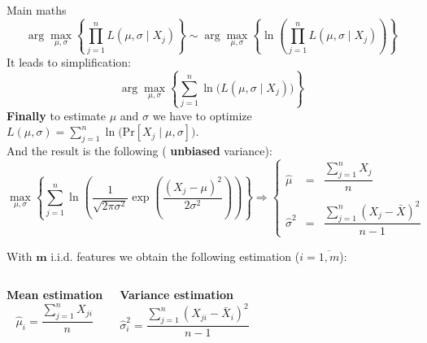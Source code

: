 \documentclass[11pt, aspectratio=169]{beamer}
\newcommand{\emphtext}[1]{\color{black} \textbf{#1}}
\newcommand{\Prob}[1]{\text{Pr}\left[#1\right]}
\begin{document}
\begin{frame}[allowframebreaks]{Main maths}
    	\begin{equation}
    		\arg \max_{\mu, \sigma} \left\{ \prod_{j = 1}^{n} L\left(\mu, \sigma \mid X_j\right) \right\} \sim \arg \max_{\mu, \sigma} \left\{ \ln\left(\prod_{j = 1}^{n} L\left(\mu, \sigma \mid X_j\right)\right) \right\}
    	\end{equation}
    	\noindent It leads to simplification:
    	\begin{equation}
    		\arg \max_{\mu, \sigma} \left\{ \sum_{j = 1}^{n} \ln \Big( L\left(\mu, \sigma \mid X_j\right) \Big) \right\}
    	\end{equation}
    	\noindent \emphtext{Finally} to estimate $\mu$ and $\sigma$ we have to optimize $L\left(\mu, \sigma\right) = \sum_{j = 1}^{n} \ln \Big(\Prob{X_j \mid \mu, \sigma}\Big)$.\\[5pt]
    	\noindent And the result is the following (\emphtext{unbiased} variance):
    	\begin{equation}
    		\label{eqn:mle_normal}
    			 \max_{\mu, \sigma} \left\{\sum_{j = 1}^{n} \ln \left( \dfrac{1}{\sqrt{2\pi\sigma^2}} \exp\left(\dfrac{\left(X_j - \mu \right)^2}{2\sigma^2}\right) \right)\right\} \Rightarrow
    			 \left\{\begin{array}{lcl}
    			 	\displaystyle \hat{\mu} &\displaystyle =&\displaystyle \dfrac{\sum_{j = 1}^n X_j}{n}\\\\
    			 	\displaystyle \hat{\sigma}^2 &\displaystyle =&\displaystyle \dfrac{\sum_{j = 1}^n \left(X_j - \bar{X}\right)^2}{n - 1}
    			 \end{array}\right.
    	\end{equation}
    	\framebreak
    	
    	\noindent With $\bm{m}$ i.i.d. features we obtain the following estimation ($i = \overline{1, m}$):
    	\begin{columns}[t]
    		\begin{block}{\textbf{Mean estimation}}
    			\begin{equation}
    				\label{eqn:mle_normal_m_features_1}
    				\hat{\mu}_i = \frac{\sum_{j = 1}^n X_{ji}}{n}
    			\end{equation}
    		\end{block}
    		\begin{block}{\textbf{Variance estimation}}
    			\begin{equation}
    				\label{eqn:mle_normal_m_features_2}
    				\hat{\sigma}_i^2 = \frac{\sum_{j = 1}^n \left(X_{ji} - \bar{X}_i\right)^2}{n - 1}
    			\end{equation}
    		\end{block}
    	\end{columns}
    	\framebreak
    	

\end{frame}
\end{document}
